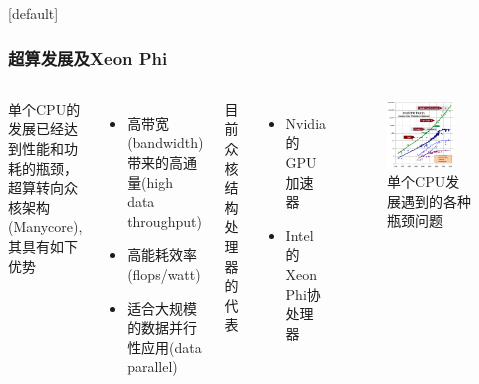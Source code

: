 \documentclass{beamer}
\makeatletter
\newenvironment{withoutheadline}{
  \setbeamertemplate{headline}[default]
  \def\beamer@entrycode{\vspace*{-\headheight}}
}{}
\makeatother
\begin{document}
\begin{withoutheadline}
\begin{frame}
	\frametitle{超算发展及Xeon Phi}
	\begin{columns}
			单个CPU的发展已经达到性能和功耗的瓶颈，超算转向众核架构(Manycore), 其具有如下优势
			\begin{itemize}
				\item 高带宽(bandwidth)带来的高通量(high data throughput)
				\item 高能耗效率(flops/watt)
				\item 适合大规模的数据并行性应用(data parallel)
			\end{itemize}
			目前众核结构处理器的代表
			\begin{itemize}
				\item Nvidia 的GPU加速器
				\item Intel 的Xeon Phi协处理器
			\end{itemize}
		\begin{figure}[htbp]
			\centering
			\includegraphics[width=0.8\textwidth]{Figures/context/CPU-Scaling.jpg}
			\caption{单个CPU发展遇到的各种瓶颈问题}
			\label{fig:CPUScale}
		\end{figure}
	\end{columns}
\end{frame}
\end{withoutheadline}
\end{document}
